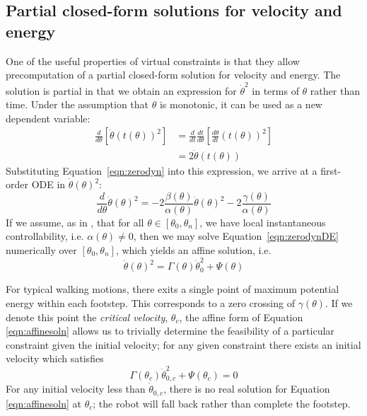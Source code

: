 \subsection{Partial closed-form solutions for velocity and energy}
One of the useful properties of virtual constraints is that they allow precomputation of a partial closed-form solution for velocity and energy. The solution is partial in that we obtain an expression for $\dot{\theta}^2$ in terms of $\theta$ rather than time. Under the assumption that $\theta$ is monotonic, it can be used as a new dependent variable:
\begin{align*}
	\frac{d}{d\theta}\left[\dot{\theta}\left(t(\theta)\right)^2\right] &= 
	\frac{d}{dt}\frac{dt}{d\theta}\left[\frac{d\theta}{dt}\left(t(\theta)\right)^2\right] \nonumber \\ 
	&= 2\ddot{\theta}\left(t(\theta)\right)
\end{align*}
Substituting Equation~\ref{eqn:zerodyn} into this expression, we arrive at a first-order ODE in $\dot{\theta}(\theta)^2$:
\begin{equation}\label{eqn:zerodynDE}
	\frac{d}{d\theta}\dot{\theta}(\theta)^2 = -2\frac{\beta(\theta)}{\alpha(\theta)}
		\dot{\theta}(\theta)^2 - 2\frac{\gamma(\theta)}{\alpha(\theta)}
\end{equation}
If we assume, as in \cite{manchester13planning}, that for all $\theta \in [\theta_0, \theta_n]$, we have local instantaneous controllability, i.e. $\alpha(\theta) \neq 0$, then we may solve Equation~\ref{eqn:zerodynDE} numerically over $[\theta_0, \theta_n]$, which yields an affine solution, i.e.
\begin{equation} \label{eqn:affinesoln}
	\dot{\theta}(\theta)^2 = \Gamma(\theta)\dot{\theta}_0^2 + \Psi(\theta)
\end{equation}

For typical walking motions, there exits a single point of maximum potential energy within each footstep. This corresponds to a zero crossing of $\gamma(\theta)$. If we denote this point the \textit{critical velocity}, $\theta_c$, the affine form of Equation \ref{eqn:affinesoln} allows us to trivially determine the feasibility of a particular constraint given the initial velocity; for any given constraint there exists an initial velocity which satisfies
\begin{equation} \label{eqn:critvel}
	\Gamma(\theta_c)\dot{\theta}_{0,c}^2 + \Psi(\theta_c) = 0
\end{equation}
For any initial velocity less than $\dot{\theta}_{0,c}$, there is no real solution for Equation \ref{eqn:affinesoln} at $\theta_c$; the robot will fall back rather than complete the footstep.

